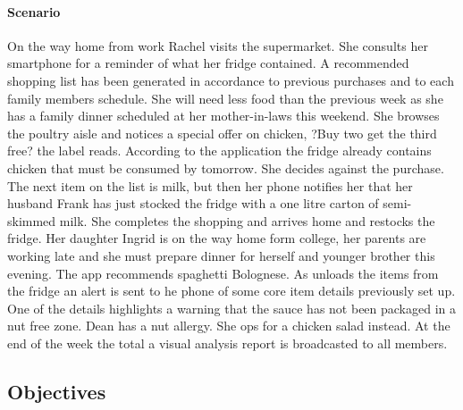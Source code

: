 \documentclass[a4paper, 11pt]{article}
\begin{document}
\paragraph{Scenario}On the way home from work Rachel visits the supermarket. She consults her smartphone for a reminder of what her fridge contained. A recommended shopping list has been generated in accordance to previous purchases and to each family members schedule. She will need less food than the previous week as she has a family dinner scheduled at her mother-in-laws this weekend. She browses the poultry aisle and notices a special offer on chicken, ?Buy two get the third free? the label reads. According to the application the fridge already contains chicken that must be consumed by tomorrow. She decides against the purchase. The next item on the list is milk, but then her phone notifies her that her husband Frank has just stocked the fridge with a one litre carton of semi-skimmed milk. She completes the shopping and arrives home and restocks the fridge. Her daughter Ingrid is on the way home form college, her parents are working late and she must prepare dinner for herself and younger brother this evening. The app recommends spaghetti Bolognese. As unloads the items from the fridge an alert is sent to he phone of some core item details previously set up. One of the details highlights a warning that the sauce has not been packaged in a nut free zone. Dean has a nut allergy. She ops for a chicken salad instead. At the end of the week the total a visual analysis report is broadcasted to all members.

\subsection{Objectives}
\end{document}

